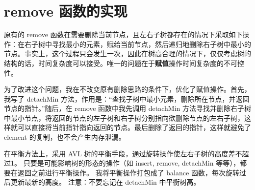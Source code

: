 \documentclass[UTF8]{ctexart}
\begin{document}
\pagestyle{fancy}
\fancyhead{}

\section{remove 函数的实现}
原有的 remove 函数在需要删除当前节点，且左右子树都存在的情况下采取如下操作：在右子树中寻找最小的元素，赋给当前节点，然后递归地删除右子树中最小的节点。事实上，这个过程只会发生一次，因此在树高合理的情况下，仅仅考虑树的结构的话，时间复杂度可以接受。唯一的问题在于\textbf{赋值}操作时间复杂度的不可控性。

为了改进这个问题，我在不改变原有删除思路的条件下，优化了赋值操作。首先，我写了 detachMin 方法，作用是：“查找子树中最小元素，删除所在节点，并返回节点的指针。”随后，在 remove 函数中我先调用 detachMin 方法寻找并删除右子树中最小节点，将返回的节点的左子树和右子树分别指向欲删除节点的左右子树，这样就可以直接将当前指针指向返回的节点。最后删除了返回的指针，这样就避免了 element 的复制，也不会产生内存泄漏。

在平衡方法上，采用 AVL 树的平衡手段，通过旋转操作使左右子树的高度差不超过1。
只要是可能影响树的形态的操作（如 insert, remove, detachMin 等等），都要在返回之前进行平衡操作。
我将平衡操作打包成了 balance 函数，每次旋转过后更新最新的高度。
注意：不要忘记在 detachMin 中平衡树高。
\end{document}
